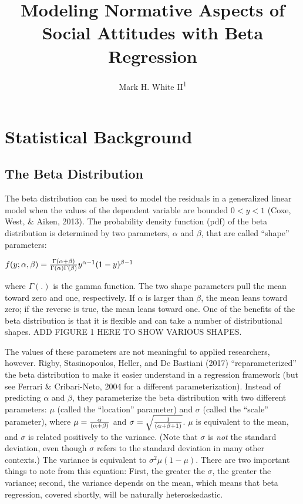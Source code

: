 \documentclass[english,man]{apa6}
\title{Modeling Normative Aspects of Social Attitudes with Beta Regression}
\author{Mark H. White II\textsuperscript{1}}
\affiliation{
    \vspace{0.5cm}
          \textsuperscript{1} University of Kansas  }
\theoremstyle{definition}
\theoremstyle{definition}
\theoremstyle{remark}
\begin{document}
\maketitle

\setcounter{secnumdepth}{0}



\section{Statistical Background}\label{statistical-background}

\subsection{The Beta Distribution}\label{the-beta-distribution}

The beta distribution can be used to model the residuals in a
generalized linear model when the values of the dependent variable are
bounded \(0 < y < 1\) (Coxe, West, \& Aiken, 2013). The probability
density function (pdf) of the beta distribution is determined by two
parameters, \(\alpha\) and \(\beta\), that are called \enquote{shape}
parameters:

\begin{center}
$f(y;\alpha,\beta)={\Gamma(\alpha+\beta)\over\Gamma(\alpha)\Gamma(\beta)}y^{\alpha-1}(1-y)^{\beta-1}$
\end{center}

where \(\Gamma(.)\) is the gamma function. The two shape parameters pull
the mean toward zero and one, respectively. If \(\alpha\) is larger than
\(\beta\), the mean leans toward zero; if the reverse is true, the mean
leans toward one. One of the benefits of the beta distribution is that
it is flexible and can take a number of distributional shapes. ADD
FIGURE 1 HERE TO SHOW VARIOUS SHAPES.

The values of these parameters are not meaningful to applied
researchers, however. Rigby, Stasinopoulos, Heller, and De Bastiani
(2017) \enquote{reparameterized} the beta distribution to make it easier
understand in a regression framework (but see Ferrari \& Cribari-Neto,
2004 for a different parameterization). Instead of predicting \(\alpha\)
and \(\beta\), they parameterize the beta distribution with two
different parameters: \(\mu\) (called the \enquote{location} parameter)
and \(\sigma\) (called the \enquote{scale} parameter), where
\(\mu={\alpha\over(\alpha+\beta)}\) and
\(\sigma=\sqrt{1\over(\alpha+\beta+1)}\). \(\mu\) is equivalent to the
mean, and \(\sigma\) is related positively to the variance. (Note that
\(\sigma\) is \emph{not} the standard deviation, even though \(\sigma\)
refers to the standard deviation in many other contexts.) The variance
is equivalent to \(\sigma^2\mu(1-\mu)\). There are two important things
to note from this equation: First, the greater the \(\sigma\), the
greater the variance; second, the variance depends on the mean, which
means that beta regression, covered shortly, will be naturally
heteroskedastic.
\end{document}
